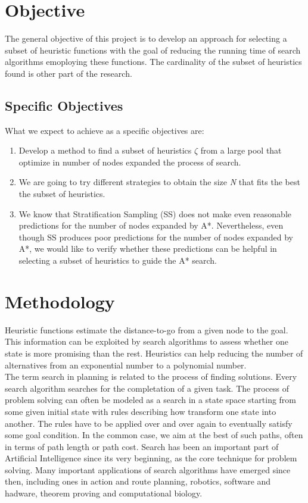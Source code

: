 \documentclass[a4paper,12pt]{article}
\begin{document}
\section{Objective}

The general objective of this project is to develop an approach for selecting a subset of heuristic functions with the goal of reducing the running time of search algorithms emoploying these functions. The cardinality of the subset of heuristics found is other part of the research.

\subsection{Specific Objectives}
What we expect to achieve as a specific objectives are:
\begin{enumerate}
\item Develop a method to find a subset of heuristics $\zeta$ from a large pool that optimize in number of nodes expanded the process of search.
\item We are going to try different strategies to obtain the size \textit{N} that fits the best the subset of heuristics.
\item We know that Stratification Sampling (SS) does not make even reasonable predictions for the number of nodes expanded by A*. Nevertheless, even though SS produces poor predictions for the number of nodes expanded by A*, we would like to verify whether these predictions can be helpful in selecting a subset of heuristics to guide the A* search.
\end{enumerate}

\section{Methodology}
Heuristic functions estimate the distance-to-go from a given node to the goal. This information can be exploited by search algorithms to assess whether one state is more promising than the rest. Heuristics can help reducing the number of alternatives from an exponential number to a polynomial number.\\

The term search in planning is related to the process of finding solutions. Every search algorithm searches for the completation of a given task. The process of problem solving can often be modeled as a search in a state space starting from some given initial state with rules describing how transform one state into another. The rules have to be applied over and over again to eventually satisfy some goal condition. In the common case, we aim at the best of such paths, often in terms of path length or path cost. Search has been an important part of Artificial Intelligence since its very beginning, as the core technique for problem solving. Many important applications of search algorithms have emerged since then, including ones in action and route planning, robotics, software and hadware, theorem proving and computational biology.\\
\end{document}
